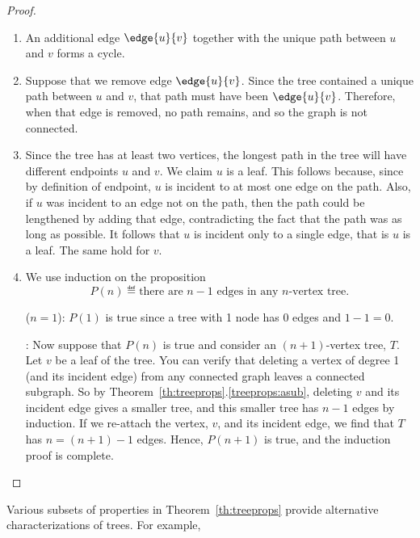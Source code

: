 \begin{proof}
\begin{enumerate}
\item An additional edge $\edge{u}{v}$ together with the unique path
  between $u$ and $v$ forms a cycle.

\item Suppose that we remove edge $\edge{u}{v}$.  Since the tree
  contained a unique path between $u$ and $v$, that path must have
  been $\edge{u}{v}$.  Therefore, when that edge is removed, no path
  remains, and so the graph is not connected.

\item
\begin{editingnotes}
\end{editingnotes}

  Since the tree has at least two vertices, the longest path in the
  tree will have different endpoints $u$ and $v$.  We claim $u$ is a
  leaf.  This follows because, since by definition of endpoint, $u$ is
  incident to at most one edge on the path.  Also, if $u$ was incident to
  an edge not on the path, then the path could be lengthened by adding
  that edge, contradicting the fact that the path was as long as
  possible.  It follows that $u$ is incident only to a single edge,
  that is $u$ is a leaf.  The same hold for $v$.

\item We use induction on the proposition
\[
P(n) \eqdef \text{there are $n - 1$ edges in any $n$-vertex tree}.
\]

 ($n = 1$): $P(1)$ is true since a tree with
1 node has 0 edges and $1 - 1 = 0$.

: Now suppose that $P(n)$ is true and
consider an $(n+1)$-vertex tree, $T$.  Let $v$ be a leaf of the tree.
You can verify that deleting a vertex of degree 1 (and its incident
edge) from any connected graph leaves a connected subgraph.  So by
Theorem~\ref{th:treeprops}.\ref{treeprops:asub}, deleting $v$ and its
incident edge gives a smaller tree, and this smaller tree has $n - 1$
edges by induction.  If we re-attach the vertex, $v$, and its incident
edge, we find that $T$ has $n = (n + 1) - 1$ edges.  Hence, $P(n + 1)$
is true, and the induction proof is complete.  \qedhere

\end{enumerate}

\end{proof}

Various subsets of properties in Theorem~\ref{th:treeprops} provide
alternative characterizations of trees.  For example,

